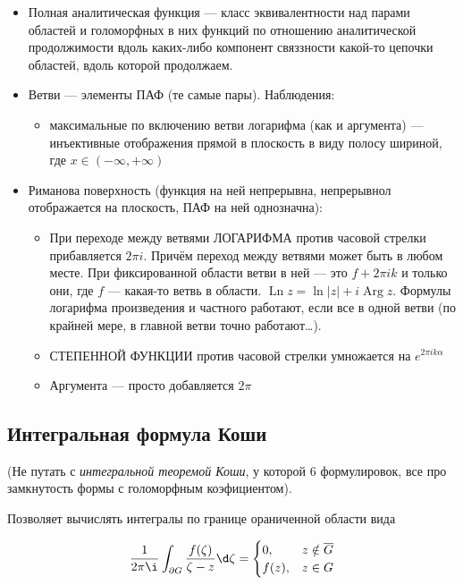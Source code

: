 \documentclass[12pt, a4paper]{article}
\begin{document}
\begin{itemize}
  \item Полная аналитическая функция — класс эквивалентности над парами областей и голоморфных в них функций по отношению аналитической продолжимости 
  вдоль каких-либо компонент связзности какой-то цепочки областей, вдоль которой продолжаем.
  \item Ветви — элементы ПАФ (те самые пары). Наблюдения:
  \begin{itemize}
    \item максимальные по включению ветви логарифма (как и аргумента) — инъективные отображения прямой в плоскость в виду полосу шириной, где $x \in (-∞, +∞)$
  \end{itemize}
  \item Риманова поверхность (функция на ней непрерывна, непрерывнол отображается на плоскость, ПАФ на ней однозначна):
  \begin{itemize}
    \item При переходе между ветвями ЛОГАРИФМА против часовой стрелки прибавляется $2\pi i$. Причём переход между ветвями может быть в любом месте. При фиксированной области ветви в ней — это $f + 2\pi i k$ и только они, где $f$ — какая-то ветвь в области. $\operatorname{Ln} z = \ln |z| + i\operatorname{Arg} z$.
    Формулы логарифма произведения и частного работают, если все в одной ветви (по крайней мере, в главной ветви точно работают…).
    \item \ditto СТЕПЕННОЙ ФУНКЦИИ против часовой стрелки умножается на $e^{2 \pi i k \alpha}$
    \item \ditto Аргумента — просто добавляется $2\pi$
  \end{itemize}
\end{itemize}




\subsection{Интегральная формула Коши}

(Не путать с \textit{интегральной теоремой Коши}, у которой 6 формулировок, все про замкнутость формы с голоморфным коэфициентом).

Позволяет вычислять интегралы по границе ораниченной области вида 

\begin{equation}
  \frac{1}{2 \pi \i}\int_{\partial G} \frac{f(\zeta)}{\zeta - z} \d\zeta = \begin{cases}
    0, & z \notin \overline{G} \\
    f(z), & z \in G
  \end{cases}
\end{equation}
\end{document}

